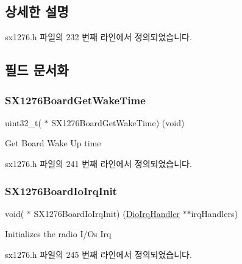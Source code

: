 \subsection{상세한 설명}


sx1276.\+h 파일의 232 번째 라인에서 정의되었습니다.



\subsection{필드 문서화}
\mbox{\label{structs_board_callback_a731a806acb4adddba9464cf0b4b6dd9e}} 
\subsubsection{\texorpdfstring{S\+X1276\+Board\+Get\+Wake\+Time}{SX1276BoardGetWakeTime}}
{\footnotesize\ttfamily uint32\+\_\+t( $\ast$ S\+X1276\+Board\+Get\+Wake\+Time) (void)}



Get Board Wake Up time 



sx1276.\+h 파일의 241 번째 라인에서 정의되었습니다.

\mbox{\label{structs_board_callback_a400401342a36091fbcf88f1a8ef81db7}} 
\subsubsection{\texorpdfstring{S\+X1276\+Board\+Io\+Irq\+Init}{SX1276BoardIoIrqInit}}
{\footnotesize\ttfamily void( $\ast$ S\+X1276\+Board\+Io\+Irq\+Init) (\mbox{\hyperlink{sx1276_8h_af462584f307238535daaea42f6ce791c}{Dio\+Irq\+Handler}} $\ast$$\ast$irq\+Handlers)}



Initializes the radio I/\+Os Irq 



sx1276.\+h 파일의 245 번째 라인에서 정의되었습니다.


